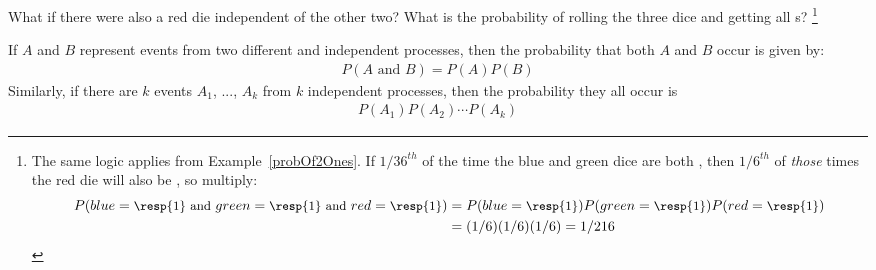 \begin{exercise}{What if there were also a red die independent of the other two? What is the probability of rolling the three dice and getting all s?}\label{threeDice}
\footnote{The same logic applies from Example~\ref{probOf2Ones}. If $1/36^{th}$ of the time the blue and green dice are both , then $1/6^{th}$ of \emph{those} times the red die will also be , so multiply:
{\begin{align*}
P(blue=\text{\small\resp{1} and } green=\text{\small\resp{1} and } red=\text{\small\resp{1}})
	&= P(blue=\text{\small\resp{1}}) P(green=\text{\small\resp{1}}) P(red=\text{\small\resp{1}}) \\
	&= (1/6) (1/6) (1/6)
	= 1/216
\end{align*}} \vspace{-7mm}
}
\end{exercise}


\begin{termBox}{
If $A$ and $B$ represent events from two different and independent processes, then the probability that both $A$ and $B$ occur is given by: \vspace{-1.5mm}
\begin{eqnarray}\label{eqForIndependentEvents}
P(A \text{ and }B) = P(A)  P(B)
\end{eqnarray}
Similarly, if there are $k$ events $A_1$, ..., $A_k$ from $k$ independent processes, then the probability they all occur is\vspace{-1.5mm}
\begin{eqnarray*}
P(A_1) P(A_2) \cdots P(A_k)
\end{eqnarray*}\vspace{-6mm}}
\end{termBox}


